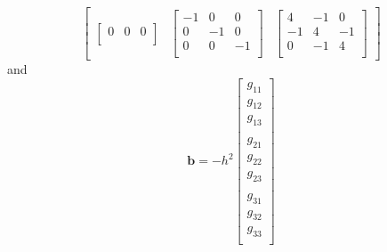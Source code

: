 \documentclass[12pt]{article}
\begin{document}
\[\begin{bmatrix}
\begin{bmatrix}
                0 & 0 & 0\\
            \end{bmatrix}
            &
            \begin{bmatrix}
                -1 & 0  & 0 \\
                0  & -1 & 0 \\
                0  & 0  & -1\\
            \end{bmatrix}
            &
            \begin{bmatrix}
                4  & -1 & 0 \\
                -1 & 4  & -1\\
                0  & -1 & 4 \\
            \end{bmatrix}
        \end{bmatrix}
    \]
    and 
    \[
        \mathbf{b} = -h^{2}
        \begin{bmatrix}
            g_{11}\\
            g_{12}\\
            g_{13}\\
            \\
            g_{21}\\
            g_{22}\\
            g_{23}\\
            \\
            g_{31}\\
            g_{32}\\
            g_{33}\\
        \end{bmatrix}
    \]

    
\end{document}
